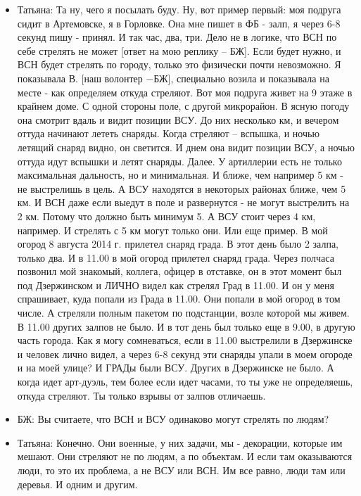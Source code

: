 \begin{itemize}
\item Татьяна: Та ну, чего я посылать буду. Ну, вот пример первый: моя подруга сидит
в Артемовске, я в Горловке. Она мне пишет в ФБ - залп, я через 6-8 секунд пишу
- принял.  И так час, два, три. Дело не в логике, что ВСН по себе стрелять не
может [ответ на мою реплику – БЖ]. Если будет нужно, и ВСН будет стрелять по
городу, только это физически почти невозможно. Я показывала В. [наш волонтер
−БЖ], специально возила и показывала на месте - как определяем откуда стреляют.
Вот моя подруга живет на 9 этаже в крайнем доме. С одной стороны поле, с другой
микрорайон. В ясную погоду она смотрит вдаль и видит позиции ВСУ. До них
несколько км, и вечером оттуда начинают лететь снаряды. Когда стреляют –
вспышка, и ночью летящий снаряд видно, он светится. И днем она видит позиции
ВСУ, а ночью оттуда идут вспышки и летят снаряды. Далее. У артиллерии есть не
только максимальная дальность, но и минимальная. И ближе, чем например 5 км -
не выстрелишь в цель. А ВСУ находятся в некоторых районах ближе, чем 5 км. И
ВСН даже если выедут в поле и развернутся - не могут выстрелить на 2 км. Потому
что должно быть минимум 5. А ВСУ стоит через 4 км, например. И стрелять с 5 км
могут только они. Или еще пример. В мой огород 8 августа 2014 г. прилетел
снаряд града. В этот день было 2 залпа, только два. И в 11.00 в мой огород
прилетел снаряд града. Через полчаса позвонил мой знакомый, коллега, офицер в
отставке, он в этот момент был под Дзержинском и ЛИЧНО видел как стрелял Град в
11.00. И он у меня спрашивает, куда попали из Града в 11.00. Они попали в мой
огород в том числе. А стреляли полным пакетом по подстанции, возле которой мы
живем. В 11.00 других залпов не было. И в тот день был только еще в 9.00, в
другую часть города. Как я могу сомневаться, если в 11.00 выстрелили в
Дзержинске и человек лично видел, а через 6-8 секунд эти снаряды упали в моем
огороде и на моей улице? И ГРАДы были ВСУ. Других в Дзержинске не было. А когда
идет арт-дуэль, тем более если идет часами, то ты уже не определяешь, откуда
стреляют. Ты только взрывы от залпов отличаешь.

\item БЖ: Вы считаете, что ВСН и ВСУ одинаково могут стрелять по людям?

\item Татьяна: Конечно. Они военные, у них задачи, мы - декорации, которые им мешают.
Они стреляют не по людям, а по объектам. И если там оказываются люди, то это их
проблема, а не ВСУ или ВСН. Им все равно, люди там или деревья. И одним и
другим.


\end{itemize}
